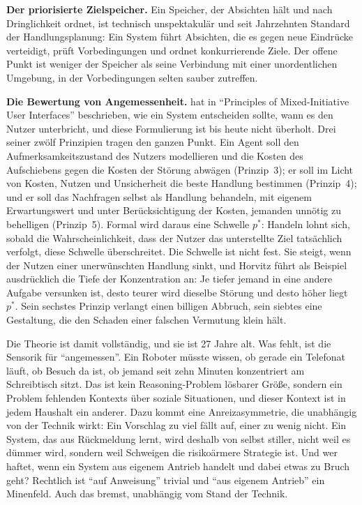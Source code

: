 \documentclass[acmlarge, noacm]{acmart}
\begin{document}
\textbf{Der priorisierte Zielspeicher.} Ein Speicher, der Absichten hält und nach Dringlichkeit ordnet, ist technisch unspektakulär und seit Jahrzehnten Standard der Handlungsplanung: Ein System führt Absichten, die es gegen neue Eindrücke verteidigt, prüft Vorbedingungen und ordnet konkurrierende Ziele. Der offene Punkt ist weniger der Speicher als seine Verbindung mit einer unordentlichen Umgebung, in der Vorbedingungen selten sauber zutreffen.

\textbf{Die Bewertung von Angemessenheit.} \citet{horvitz1999} hat in ``Principles of Mixed-Initiative User Interfaces'' beschrieben, wie ein System entscheiden sollte, wann es den Nutzer unterbricht, und diese Formulierung ist bis heute nicht überholt. Drei seiner zwölf Prinzipien tragen den ganzen Punkt. Ein Agent soll den Aufmerksamkeitszustand des Nutzers modellieren und die Kosten des Aufschiebens gegen die Kosten der Störung abwägen (Prinzip~3); er soll im Licht von Kosten, Nutzen und Unsicherheit die beste Handlung bestimmen (Prinzip~4); und er soll das Nachfragen selbst als Handlung behandeln, mit eigenem Erwartungswert und unter Berücksichtigung der Kosten, jemanden unnötig zu behelligen (Prinzip~5). Formal wird daraus eine Schwelle $p^*$: Handeln lohnt sich, sobald die Wahrscheinlichkeit, dass der Nutzer das unterstellte Ziel tatsächlich verfolgt, diese Schwelle überschreitet. Die Schwelle ist nicht fest. Sie steigt, wenn der Nutzen einer unerwünschten Handlung sinkt, und Horvitz führt als Beispiel ausdrücklich die Tiefe der Konzentration an: Je tiefer jemand in eine andere Aufgabe versunken ist, desto teurer wird dieselbe Störung und desto höher liegt $p^*$. Sein sechstes Prinzip verlangt einen billigen Abbruch, sein siebtes eine Gestaltung, die den Schaden einer falschen Vermutung klein hält.

Die Theorie ist damit vollständig, und sie ist 27 Jahre alt. Was fehlt, ist die Sensorik für ``angemessen''. Ein Roboter müsste wissen, ob gerade ein Telefonat läuft, ob Besuch da ist, ob jemand seit zehn Minuten konzentriert am Schreibtisch sitzt. Das ist kein Reasoning-Problem lösbarer Größe, sondern ein Problem fehlenden Kontexts über soziale Situationen, und dieser Kontext ist in jedem Haushalt ein anderer. Dazu kommt eine Anreizasymmetrie, die unabhängig von der Technik wirkt: Ein Vorschlag zu viel fällt auf, einer zu wenig nicht. Ein System, das aus Rückmeldung lernt, wird deshalb von selbst stiller, nicht weil es dümmer wird, sondern weil Schweigen die risikoärmere Strategie ist. Und wer haftet, wenn ein System aus eigenem Antrieb handelt und dabei etwas zu Bruch geht? Rechtlich ist ``auf Anweisung'' trivial und ``aus eigenem Antrieb'' ein Minenfeld. Auch das bremst, unabhängig vom Stand der Technik.
\end{document}
